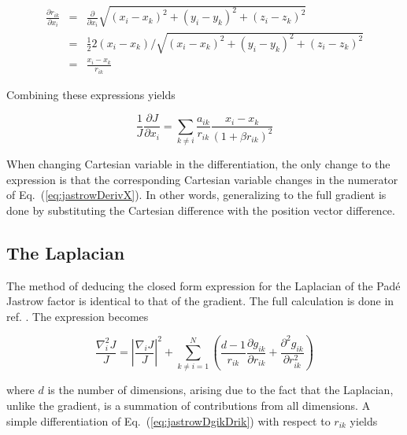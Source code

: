\begin{eqnarray}
 \frac{\partial r_{ik}}{\partial x_i} &=& \frac{\partial }{\partial x_i} \sqrt{(x_i - x_k)^2 + (y_i - y_k)^2 + (z_i - z_k)^2} \nonumber \\
  &=& \frac{1}{2} 2(x_i - x_k) / \sqrt{(x_i - x_k)^2 + (y_i - y_k)^2 + (z_i - z_k)^2} \nonumber \\
  &=& \frac{x_i - x_k}{r_{ik}}
\end{eqnarray}

Combining these expressions yields

\begin{equation}
\label{eq:jastrowDerivX}
 \frac{1}{J}\frac{\partial J}{\partial x_i} = \sum_{k \ne i} \frac{a_{ik}}{r_{ik}}\frac{x_i - x_k}{(1 + \beta r_{ik})^2}
\end{equation}

When changing Cartesian variable in the differentiation, the only change to the expression is that the corresponding Cartesian variable changes in the numerator of Eq.~(\ref{eq:jastrowDerivX}). In other words, generalizing to the full gradient is done by substituting the Cartesian difference with the position vector difference.



\subsection{The Laplacian}

The method of deducing the closed form expression for the Laplacian of the Padé Jastrow factor is identical to that of the gradient. The full calculation is done in ref. \cite{morten}. The expression becomes

\begin{equation}
\label{eq:jastrowLaplRaw}
 \frac{\nabla^2_i J}{J} = \left| \frac{\nabla_i J}{J}\right|^2 + \sum_{k \ne i = 1}^N \left(\frac{d-1}{r_{ik}}\frac{\partial g_{ik}}{\partial r_{ik}} + \frac{\partial^2 g_{ik}}{\partial r_{ik}^2}\right) 
\end{equation}

where $d$ is the number of dimensions, arising due to the fact that the Laplacian, unlike the gradient, is a summation of contributions from all dimensions. A simple differentiation of Eq.~(\ref{eq:jastrowDgikDrik}) with respect to $r_{ik}$ yields

